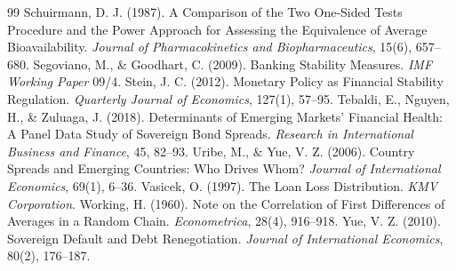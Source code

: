 \begin{thebibliography}{99}
 Schuirmann, D. J. (1987). A Comparison of the Two One-Sided Tests Procedure and the Power Approach for Assessing the Equivalence of Average Bioavailability. \textit{Journal of Pharmacokinetics and Biopharmaceutics}, 15(6), 657--680.
 Segoviano, M., \& Goodhart, C. (2009). Banking Stability Measures. \textit{IMF Working Paper} 09/4.
 Stein, J. C. (2012). Monetary Policy as Financial Stability Regulation. \textit{Quarterly Journal of Economics}, 127(1), 57--95.
 Tebaldi, E., Nguyen, H., \& Zuluaga, J. (2018). Determinants of Emerging Markets' Financial Health: A Panel Data Study of Sovereign Bond Spreads. \textit{Research in International Business and Finance}, 45, 82--93.
 Uribe, M., \& Yue, V. Z. (2006). Country Spreads and Emerging Countries: Who Drives Whom? \textit{Journal of International Economics}, 69(1), 6--36.
 Vasicek, O. (1997). The Loan Loss Distribution. \textit{KMV Corporation}.
 Working, H. (1960). Note on the Correlation of First Differences of Averages in a Random Chain. \textit{Econometrica}, 28(4), 916--918.
 Yue, V. Z. (2010). Sovereign Default and Debt Renegotiation. \textit{Journal of International Economics}, 80(2), 176--187.
\end{thebibliography}
